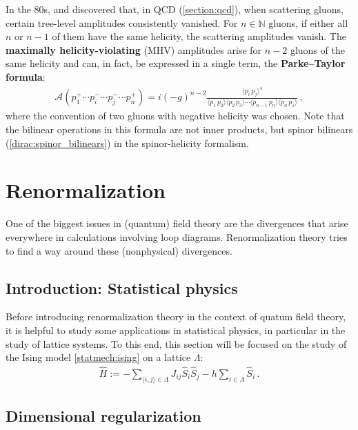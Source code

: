     In the 80s,  and  discovered that, in QCD (\cref{section:qcd}), when scattering gluons, certain tree-level amplitudes consistently vanished. For $n\in\mathbb{N}$ gluons, if either all $n$ or $n-1$ of them have the same helicity, the scattering amplitudes vanish. The \textbf{maximally helicity-violating} (MHV) amplitudes arise for $n-2$ gluons of the same helicity and can, in fact, be expressed in a single term, the \textbf{Parke--Taylor formula}:
    \begin{gather}
        \mathcal{A}(p_1^+\cdots p_i^-\cdots p_j^-\cdots p_n^+) = i(-g)^{n-2}\frac{\langle p_i\,p_j\rangle^4}{\langle p_1\,p_2\rangle\langle p_2\,p_3\rangle\cdots\langle p_{n-1}\,p_n\rangle\langle p_n\,p_1\rangle}\,,
    \end{gather}
    where the convention of two gluons with negative helicity was chosen. Note that the bilinear operations in this formula are not inner products, but spinor bilinears (\cref{dirac:spinor_bilinears}) in the spinor-helicity formalism.

\section{Renormalization}

    One of the biggest issues in (quantum) field theory are the divergences that arise everywhere in calculations involving loop diagrams. Renormalization theory tries to find a way around these (nonphysical) divergences.

\subsection{Introduction: Statistical physics}

    Before introducing renormalization theory in the context of quatum field theory, it is helpful to study some applications in statistical physics, in particular in the study of lattice systems. To this end, this section will be focused on the study of the Ising model \ref{statmech:ising} on a lattice $\Lambda$:
    \begin{gather}
        \widehat{H} := -\sum_{\langle i,j \rangle\in\Lambda}J_{ij}\widehat{S}_i\widehat{S}_j-h\sum_{i\in\Lambda}\widehat{S}_i\,.
    \end{gather}

\subsection{Dimensional regularization}

